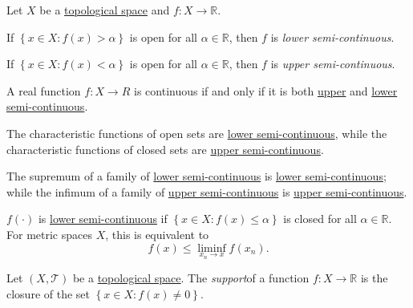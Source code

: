 \begin{definition*}
	Let \(X\) be a \hyperref[def:topological-space]{topological space} and \(f\colon X \to \mathbb{R} \).
	\begin{definition}\label{def:lower-semi-continuous}
		If \(\left\{ x\in X\colon f(x) > \alpha  \right\} \) is open for all \(\alpha \in \mathbb{R} \), then \(f\) is \emph{lower semi-continuous}.
	\end{definition}
	\begin{definition}\label{def:upper-semi-continuous}
		If \(\left\{ x\in X\colon f(x) < \alpha  \right\} \) is open for all \(\alpha \in \mathbb{R} \), then \(f\) is \emph{upper semi-continuous}.
	\end{definition}
\end{definition*}

\begin{remark}
	A real function \(f\colon X \to R\) is continuous if and only if it is both \hyperref[def:upper-semi-continuous]{upper} and \hyperref[def:lower-semi-continuous]{lower semi-continuous}.
\end{remark}

\begin{remark}
	The characteristic functions of open sets are \hyperref[def:lower-semi-continuous]{lower semi-continuous}, while the characteristic functions of closed sets are \hyperref[def:upper-semi-continuous]{upper semi-continuous}.
\end{remark}

\begin{remark}
	The supremum of a family of \hyperref[def:lower-semi-continuous]{lower semi-continuous} is \hyperref[def:lower-semi-continuous]{lower semi-continuous}; while the infimum of a family of \hyperref[def:upper-semi-continuous]{upper semi-continuous} is \hyperref[def:upper-semi-continuous]{upper semi-continuous}.
\end{remark}

\begin{remark}
	\(f(\cdot)\) is \hyperref[def:lower-semi-continuous]{lower semi-continuous} if \(\left\{ x\in X\colon f(x) \leq \alpha \right\} \) is closed for all \(\alpha \in \mathbb{R} \). For metric spaces \(X\), this is equivalent to
	\[
		f(x) \leq \liminf_{x_n \to x} f(x_n).
	\]
\end{remark}

\begin{definition}[Support]\label{def:support}
	Let \((X, \mathcal{T} )\) be a \hyperref[def:topological-space]{topological space}. The \emph{support}of a function \(f\colon X \to \mathbb{R} \) is the closure of the set \(\left\{ x\in X\colon f(x) \neq 0 \right\}\).
\end{definition}

